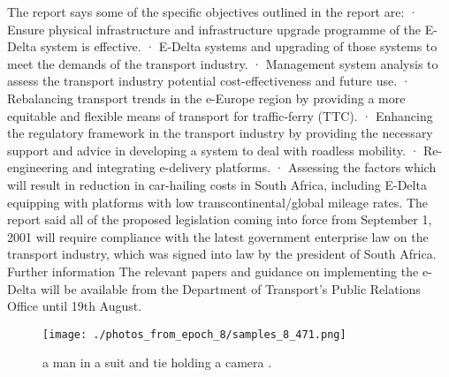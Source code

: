 \documentclass{article}%
\begin{document}
The report says some of the specific objectives outlined in the report are:\newline%
· Ensure physical infrastructure and infrastructure upgrade programme of the E{-}Delta system is effective.\newline%
· E{-}Delta systems and upgrading of those systems to meet the demands of the transport industry.\newline%
· Management system analysis to assess the transport industry potential cost{-}effectiveness and future use.\newline%
· Rebalancing transport trends in the e{-}Europe region by providing a more equitable and flexible means of transport for traffic{-}ferry (TTC).\newline%
· Enhancing the regulatory framework in the transport industry by providing the necessary support and advice in developing a system to deal with roadless mobility.\newline%
· Re{-}engineering and integrating e{-}delivery platforms.\newline%
· Assessing the factors which will result in reduction in car{-}hailing costs in South Africa, including E{-}Delta equipping with platforms with low transcontinental/global mileage rates.\newline%
The report said all of the proposed legislation coming into force from September 1, 2001 will require compliance with the latest government enterprise law on the transport industry, which was signed into law by the president of South Africa.\newline%
Further information\newline%
The relevant papers and guidance on implementing the e{-}Delta will be available from the Department of Transport's Public Relations Office until 19th August.\newline%

%


\begin{figure}[h!]%
\centering%
\texttt{[image: ./photos\_from\_epoch\_8/samples\_8\_471.png]}%
\caption{a man in a suit and tie holding a camera .}%
\end{figure}

%
\end{document}
